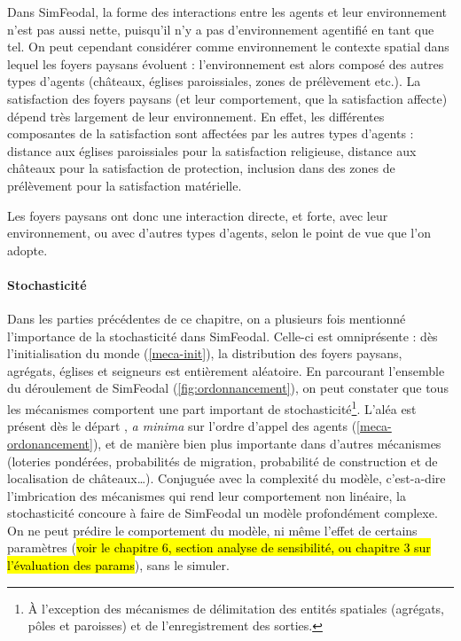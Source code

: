 Dans SimFeodal, la forme des interactions entre les agents et leur environnement n'est pas aussi nette, puisqu'il n'y a pas d'environnement \og agentifié\fg{} en tant que tel.
On peut cependant considérer comme environnement le contexte spatial dans lequel les foyers paysans évoluent : l'environnement est alors composé des autres types d'agents (châteaux, églises paroissiales, zones de prélèvement etc.).
La satisfaction des foyers paysans (et leur comportement, que la satisfaction affecte) dépend très largement de leur environnement.
En effet, les différentes composantes de la satisfaction sont affectées par les autres types d'agents : distance aux églises paroissiales pour la satisfaction religieuse, distance aux châteaux pour la satisfaction de protection, inclusion dans des zones de prélèvement pour la satisfaction matérielle.

Les foyers paysans ont donc une interaction directe, et forte, avec leur environnement, ou avec d'autres types d'agents, selon le point de vue que l'on adopte.

\paragraph{Stochasticité} Dans les parties précédentes de ce chapitre, on a plusieurs fois mentionné l'importance de la stochasticité dans SimFeodal.
Celle-ci est omniprésente : dès l'initialisation du monde (\cref{meca-init}), la distribution des foyers paysans, agrégats, églises et seigneurs est entièrement aléatoire.
En parcourant l'ensemble du déroulement de SimFeodal (\cref{fig:ordonnancement}), on peut constater que tous les mécanismes comportent une part important de stochasticité\footnote{
	À l'exception des mécanismes de \og délimitation\fg{} des entités spatiales (agrégats, pôles et paroisses) et de l'enregistrement des sorties.
}.
L'aléa est présent dès le départ , \textit{a minima} sur l'ordre d'appel des agents (\cref{meca-ordonancement}), et de manière bien plus importante dans d'autres mécanismes (loteries pondérées, probabilités de migration, probabilité de construction et de localisation de châteaux\ldots).
Conjuguée avec la complexité du modèle, c'est-a-dire l'imbrication des mécanismes qui rend leur comportement non linéaire, la stochasticité concoure à faire de SimFeodal un modèle profondément complexe.
On ne peut prédire le comportement du modèle, ni même l'effet de certains paramètres (\hl{voir le chapitre 6, section analyse de sensibilité, ou chapitre 3 sur l'évaluation des params}), sans le simuler.

